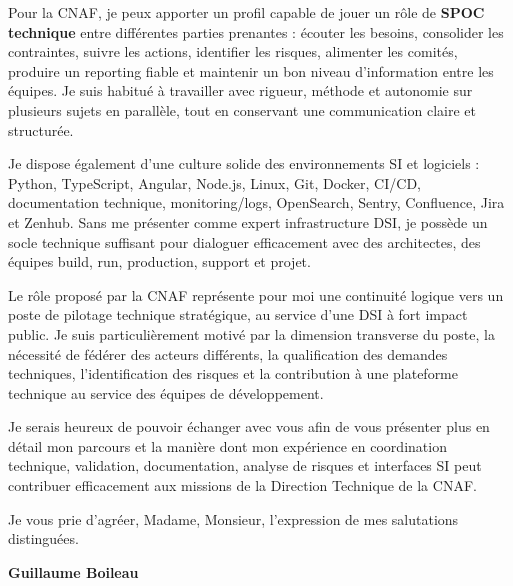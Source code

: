 \documentclass[11pt,a4paper]{altacv}
\begin{document}
{Pour la CNAF, je peux apporter un profil capable de jouer un rôle de \textbf{SPOC technique} entre différentes parties prenantes : écouter les besoins, consolider les contraintes, suivre les actions, identifier les risques, alimenter les comités, produire un reporting fiable et maintenir un bon niveau d'information entre les équipes. Je suis habitué à travailler avec rigueur, méthode et autonomie sur plusieurs sujets en parallèle, tout en conservant une communication claire et structurée.

Je dispose également d'une culture solide des environnements SI et logiciels : Python, TypeScript, Angular, Node.js, Linux, Git, Docker, CI/CD, documentation technique, monitoring/logs, OpenSearch, Sentry, Confluence, Jira et Zenhub. Sans me présenter comme expert infrastructure DSI, je possède un socle technique suffisant pour dialoguer efficacement avec des architectes, des équipes build, run, production, support et projet.

Le rôle proposé par la CNAF représente pour moi une continuité logique vers un poste de pilotage technique stratégique, au service d'une DSI à fort impact public. Je suis particulièrement motivé par la dimension transverse du poste, la nécessité de fédérer des acteurs différents, la qualification des demandes techniques, l'identification des risques et la contribution à une plateforme technique au service des équipes de développement.

Je serais heureux de pouvoir échanger avec vous afin de vous présenter plus en détail mon parcours et la manière dont mon expérience en coordination technique, validation, documentation, analyse de risques et interfaces SI peut contribuer efficacement aux missions de la Direction Technique de la CNAF.

Je vous prie d'agréer, Madame, Monsieur, l'expression de mes salutations distinguées.

\textbf{Guillaume Boileau}

}
\end{document}
